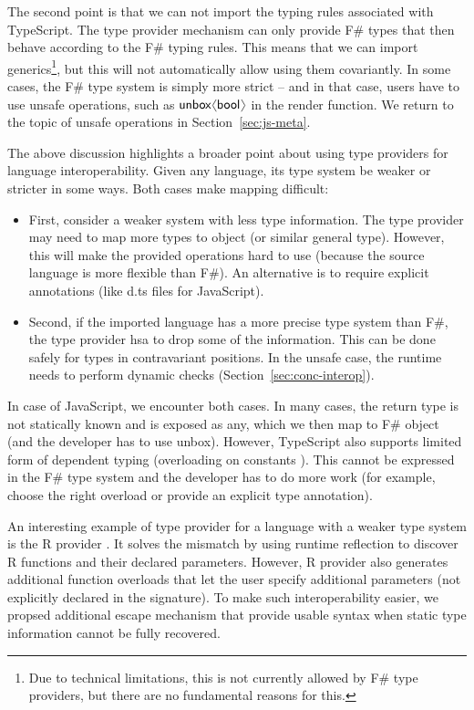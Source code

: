 \documentclass[submission,copyright,creativecommons]{eptcs}
\newcommand{\langl}{\begin{picture}(4.5,7)
\put(1.1,2.5){\rotatebox{60}{\line(1,0){5.5}}}
\put(1.1,2.5){\rotatebox{300}{\line(1,0){5.5}}}
\end{picture}}
\newcommand{\rangl}{\begin{picture}(4.5,7)
\put(.9,2.5){\rotatebox{120}{\line(1,0){5.5}}}
\put(.9,2.5){\rotatebox{240}{\line(1,0){5.5}}}
\end{picture}}
\newcommand{\kvd}[1]{\textnormal{\textcolor{kvdclr}{\sffamily #1}}}
\newcommand{\ident}[1]{\textnormal{\sffamily #1}}
\begin{document}
The second point is that we can not import the typing rules associated with TypeScript.
The type provider mechanism can only provide F\# types that then behave according to the
F\# typing rules. This means that we can import generics\footnote{Due to technical 
limitations, this is not currently allowed by F\# type providers, but there are no
fundamental reasons for this.}, but this will not automatically allow using them 
covariantly. In some cases, the F\# type system is simply more strict -- and in that case,
users have to use unsafe operations, such as $\ident{unbox}\langl \ident{bool} \rangl$ 
in the \ident{render} function. We return to the topic of unsafe operations in 
Section~\ref{sec:js-meta}.

The above discussion highlights a broader point about using type providers for language
interoperability. Given any language, its type system be weaker or stricter in some ways.
Both cases make mapping difficult:

\begin{itemize}
\item First, consider a weaker system with less type information. The type provider may need
  to map more types to \ident{object} (or similar general type). However, this will make 
  the provided operations hard to use (because the source language is more flexible than
  F\#). An alternative is to require explicit annotations (like \textcolor{strclr}{\ttfamily d.ts} 
  files for JavaScript).

\item Second, if the imported language has a more precise type system than F\#, the type 
  provider hsa to drop some of the information. This can be done safely for types in 
  contravariant positions. In the unsafe case, the runtime needs to perform dynamic checks 
  (Section~\ref{sec:conc-interop}).
\end{itemize}

\noindent
In case of JavaScript, we encounter both cases. In many cases, the return type is not
statically known and is exposed as \kvd{any}, which we then map to F\# \ident{object}
(and the developer has to use \ident{unbox}). However, TypeScript also supports limited
form of dependent typing (overloading on constants \cite{ms-typescript-09}). This cannot
be expressed in the F\# type system and the developer has to do more work (for example,
choose the right overload or provide an explicit type annotation).

An interesting example of type provider for a language with a weaker type system is the
R provider \cite{fsharp-rprovider}. It solves the mismatch by using runtime reflection 
to discover R functions and their declared parameters. However, R provider also generates
additional function overloads that let the user specify additional parameters (not explicitly 
declared in the signature). To make such interoperability easier, we propsed additional 
escape mechanism \cite{fsharp-paramsdict} that provide usable syntax when static type information 
cannot be fully recovered.
\end{document}
